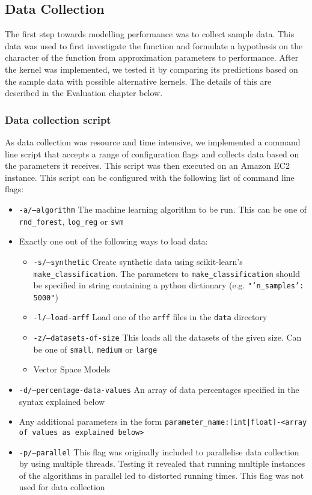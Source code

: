 \documentclass[a4paper,12pt,twoside,openright]{report}
\begin{document}
\subsection{Data Collection}
The first step towards modelling performance was to collect sample data. This data was used to first investigate the function and formulate a hypothesis on the character of the function from approximation parameters to performance. After the kernel was implemented, we tested it by comparing its predictions based on the sample data with possible alternative kernels. The details of this are described in the Evaluation chapter below.

\subsubsection{Data collection script}
As data collection was resource and time intensive, we implemented a command line script that accepts a range of configuration flags and collects data based on the parameters it receives. This script was then executed on an Amazon EC2 instance. This script can be configured with the following list of command line flags:

\begin{itemize}
\item \texttt{-a/--algorithm} The machine learning algorithm to be run. This can be one of \texttt{rnd\_forest}, \texttt{log\_reg} or \texttt{svm}
\item Exactly one out of the following ways to load data:
\begin{itemize}[label=$\star$]
        \item \texttt{-s/--synthetic} Create synthetic data using scikit-learn's \texttt{make\_classification}. The parameters to \texttt{make\_classification} should be specified in string containing a python dictionary (e.g. \texttt{"{'n\_samples': 5000}"})
        \item \texttt{-l/--load-arff} Load one of the \texttt{arff} files in the \texttt{data} directory
        \item \texttt{-z/--datasets-of-size} This loads all the datasets of the given size. Can be one of \texttt{small}, \texttt{medium} or \texttt{large}
        \item Vector Space Models
     \end{itemize}
\item \texttt{-d/--percentage-data-values} An array of data percentages specified in the syntax explained below
\item Any additional parameters in the form \texttt{parameter\_name:[int|float]-<array of values as explained below>}
\item \texttt{-p/--parallel} This flag was originally included to parallelise data collection by using multiple threads. Testing it revealed that running multiple instances of the algorithms in parallel led to distorted running times. This flag was not used for data collection
\end{itemize}
\end{document}
